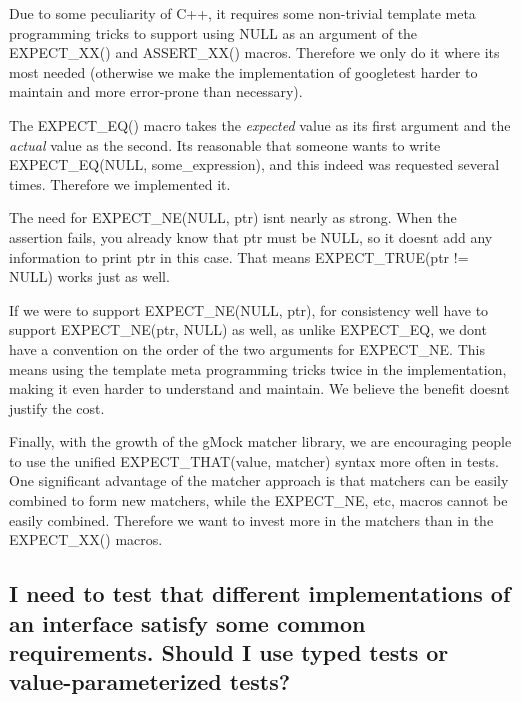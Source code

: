 Due to some peculiarity of C++, it requires some non-\/trivial template meta programming tricks to support using {\ttfamily N\+U\+LL} as an argument of the {\ttfamily E\+X\+P\+E\+C\+T\+\_\+\+X\+X()} and {\ttfamily A\+S\+S\+E\+R\+T\+\_\+\+X\+X()} macros. Therefore we only do it where it\textquotesingle{}s most needed (otherwise we make the implementation of googletest harder to maintain and more error-\/prone than necessary).

The {\ttfamily E\+X\+P\+E\+C\+T\+\_\+\+E\+Q()} macro takes the {\itshape expected} value as its first argument and the {\itshape actual} value as the second. It\textquotesingle{}s reasonable that someone wants to write {\ttfamily E\+X\+P\+E\+C\+T\+\_\+\+E\+Q(\+N\+U\+L\+L, some\+\_\+expression)}, and this indeed was requested several times. Therefore we implemented it.

The need for {\ttfamily E\+X\+P\+E\+C\+T\+\_\+\+N\+E(\+N\+U\+L\+L, ptr)} isn\textquotesingle{}t nearly as strong. When the assertion fails, you already know that {\ttfamily ptr} must be {\ttfamily N\+U\+LL}, so it doesn\textquotesingle{}t add any information to print {\ttfamily ptr} in this case. That means {\ttfamily E\+X\+P\+E\+C\+T\+\_\+\+T\+R\+UE(ptr != N\+U\+LL)} works just as well.

If we were to support {\ttfamily E\+X\+P\+E\+C\+T\+\_\+\+N\+E(\+N\+U\+L\+L, ptr)}, for consistency we\textquotesingle{}ll have to support {\ttfamily E\+X\+P\+E\+C\+T\+\_\+\+N\+E(ptr, N\+U\+L\+L)} as well, as unlike {\ttfamily E\+X\+P\+E\+C\+T\+\_\+\+EQ}, we don\textquotesingle{}t have a convention on the order of the two arguments for {\ttfamily E\+X\+P\+E\+C\+T\+\_\+\+NE}. This means using the template meta programming tricks twice in the implementation, making it even harder to understand and maintain. We believe the benefit doesn\textquotesingle{}t justify the cost.

Finally, with the growth of the g\+Mock matcher library, we are encouraging people to use the unified {\ttfamily E\+X\+P\+E\+C\+T\+\_\+\+T\+H\+A\+T(value, matcher)} syntax more often in tests. One significant advantage of the matcher approach is that matchers can be easily combined to form new matchers, while the {\ttfamily E\+X\+P\+E\+C\+T\+\_\+\+NE}, etc, macros cannot be easily combined. Therefore we want to invest more in the matchers than in the {\ttfamily E\+X\+P\+E\+C\+T\+\_\+\+X\+X()} macros.

\subsection*{I need to test that different implementations of an interface satisfy some common requirements. Should I use typed tests or value-\/parameterized tests?}

